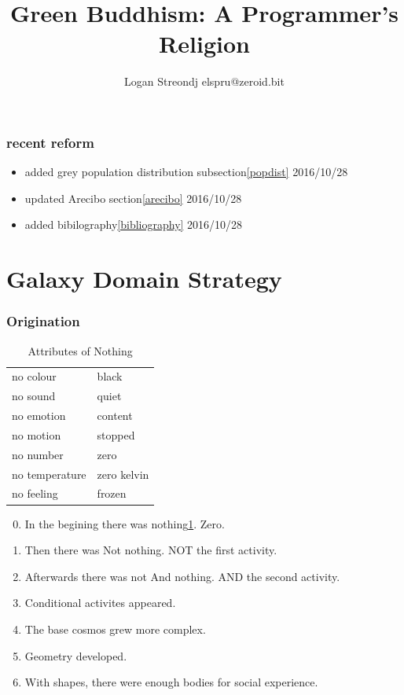 \documentclass{report}
\title{Green Buddhism: A Programmer's Religion}
\author{Logan Streondj elspru@zeroid.bit}
\begin{document}
\section{recent reform}
\begin{itemize}
  \item added grey population distribution subsection\ref{popdist}
2016/10/28
 \item updated Arecibo section\ref{arecibo} 2016/10/28
 \item added bibilography\ref{bibliography} 2016/10/28
\end{itemize}

\tableofcontents
\part{Galaxy Domain Strategy}

\section{Origination}
\label{origination}
\begin{table}
\begin{tabular}{l l} 
  no colour & black \\
  no sound & quiet \\
  no emotion & content \\
  no motion & stopped \\
  no number & zero \\
  no temperature & zero kelvin \\
  no feeling & frozen \\
\end{tabular}
\caption{Attributes of Nothing}
\label{nothing}
\end{table}
\begin{enumerate}
\setcounter{enumi}{-1}
\item In the begining there was nothing\ref{nothing}. Zero.
\item Then there was Not nothing. NOT the first activity. 
\item Afterwards there was not And nothing. AND the second activity.
\item Conditional activites appeared. 
\item The base cosmos grew more complex. 
\item Geometry developed. 
\item With shapes, there were enough bodies for social experience.
\end{enumerate}
\end{document}
